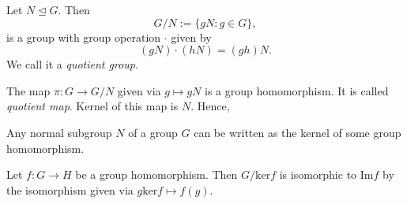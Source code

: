 \begin{definition}
    Let \(N \trianglelefteq G\). Then \[G/N := \{gN : g \in G\},\] is a group with group operation \(\cdot\) given by \[(gN)\cdot(hN) = (gh)N.\] We call it a \textit{quotient group}.
\end{definition}
The map \(\pi: G \longrightarrow G/N\) given via \(g \mapsto gN\) is a group homomorphism. It is called \textit{quotient map}. Kernel of this map is \(N\). Hence,
\begin{theorem}
    Any normal subgroup \(N\) of a group \(G\) can be written as the kernel of some group homomorphism.
\end{theorem}
\begin{theorem}
    Let \(f: G \longrightarrow H\) be a group homomorphism. Then \(G/\text{ker}f\) is isomorphic to \(\text{Im} f\) by the isomorphism given via \(g \text{ker}f \mapsto f(g).\)
\end{theorem}
